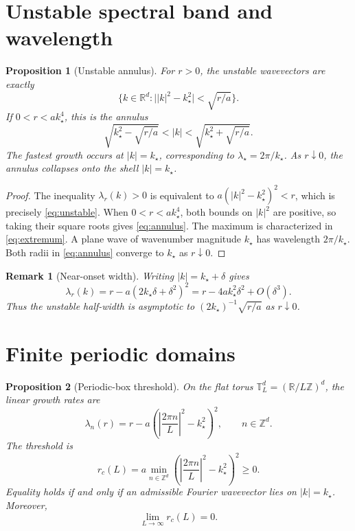 \documentclass[11pt]{article}
\newtheorem{proposition}{Proposition}
\newtheorem{remark}{Remark}
\newcommand{\R}{\mathbb{R}}
\newcommand{\Z}{\mathbb{Z}}
\begin{document}
\section{Unstable spectral band and wavelength}

\begin{proposition}[Unstable annulus]\label{prop:band}
For $r>0$, the unstable wavevectors are exactly
\begin{equation}\label{eq:unstable}
\bigl\{k\in\R^d:\bigl||k|^2-k_\star^2\bigr|<\sqrt{r/a}\bigr\}.
\end{equation}
If $0<r<ak_\star^4$, this is the annulus
\begin{equation}\label{eq:annulus}
\sqrt{k_\star^2-\sqrt{r/a}}<|k|
<\sqrt{k_\star^2+\sqrt{r/a}}.
\end{equation}
The fastest growth occurs at $|k|=k_\star$, corresponding to
$\lambda_\star=2\pi/k_\star$. As $r\downarrow0$, the annulus collapses
onto the shell $|k|=k_\star$.
\end{proposition}

\begin{proof}
The inequality $\lambda_r(k)>0$ is equivalent to
$a(|k|^2-k_\star^2)^2<r$, which is precisely
\eqref{eq:unstable}. When $0<r<ak_\star^4$,
both bounds on $|k|^2$ are positive, so taking their square roots gives
\eqref{eq:annulus}. The maximum is characterized in
\eqref{eq:extremum}. A plane wave of wavenumber magnitude $k_\star$
has wavelength $2\pi/k_\star$. Both radii in \eqref{eq:annulus}
converge to $k_\star$ as $r\downarrow0$.
\end{proof}

\begin{remark}[Near-onset width]
Writing $|k|=k_\star+\delta$ gives
\[
\lambda_r(k)
=r-a(2k_\star\delta+\delta^2)^2
=r-4ak_\star^2\delta^2+O(\delta^3).
\]
Thus the unstable half-width is asymptotic to
$(2k_\star)^{-1}\sqrt{r/a}$ as $r\downarrow0$.
\end{remark}

\section{Finite periodic domains}

\begin{proposition}[Periodic-box threshold]\label{prop:torus}
On the flat torus $\mathbb{T}_L^d=(\R/L\Z)^d$, the linear growth rates
are
\[
\lambda_n(r)=r-a\left(\left|\frac{2\pi n}{L}\right|^2-k_\star^2\right)^2,
\qquad n\in\Z^d.
\]
The threshold is
\begin{equation}\label{eq:torus-threshold}
r_c(L)=a\min_{n\in\Z^d}
\left(\left|\frac{2\pi n}{L}\right|^2-k_\star^2\right)^2\ge0.
\end{equation}
Equality holds if and only if an admissible Fourier wavevector lies on
$|k|=k_\star$. Moreover,
\begin{equation}\label{eq:limit}
\lim_{L\to\infty}r_c(L)=0.
\end{equation}
\end{proposition}
\end{document}
